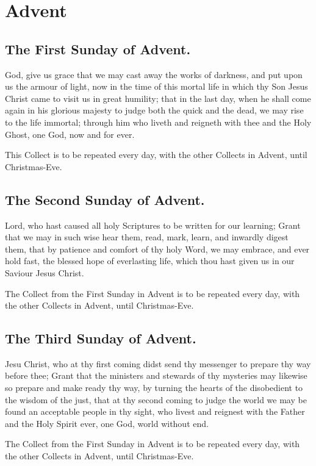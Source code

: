 
\section{Advent}

\subsection{The First Sunday of Advent.}
 God, give us grace that we may cast away the works of darkness, and put upon us the armour of light, now in the time of this mortal life in which thy Son Jesus Christ came to visit us in great humility; that in the last day, when he shall come again in his glorious majesty to judge both the quick and the dead, we may rise to the life immortal; through him who liveth and reigneth with thee and the Holy Ghost, one God, now and for ever.
\begin{secrubric}
This Collect is to be repeated every day, with the other Collects in Advent, until Christmas-Eve.
\end{secrubric}

\subsection{The Second Sunday of Advent.}
 Lord, who hast caused all holy Scriptures to be written for our learning; Grant that we may in such wise hear them, read, mark, learn, and inwardly digest them, that by patience and comfort of thy holy Word, we may embrace, and ever hold fast, the blessed hope of everlasting life, which thou hast given us in our Saviour Jesus Christ.
\begin{secrubric}
The Collect from the First Sunday in Advent is to be repeated every day, with the other Collects in Advent, until Christmas-Eve.
\end{secrubric}

\subsection{The Third Sunday of Advent.}
 Jesu Christ, who at thy first coming didst send thy messenger to prepare thy way before thee; Grant that the ministers and stewards of thy mysteries may likewise so prepare and make ready thy way, by turning the hearts of the disobedient to the wisdom of the just, that at thy second coming to judge the world we may be found an acceptable people in thy sight, who livest and reignest with the Father and the Holy Spirit ever, one God, world without end.
\begin{secrubric}
The Collect from the First Sunday in Advent is to be repeated every day, with the other Collects in Advent, until Christmas-Eve.
\end{secrubric}

